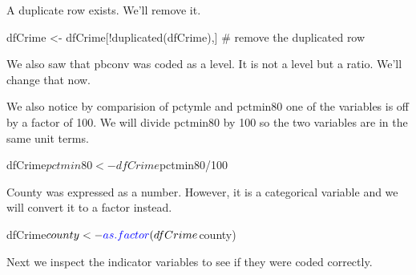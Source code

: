 \documentclass[]{article}
\newenvironment{Shaded}{}{}
\newcommand{\CommentTok}[1]{\textcolor[rgb]{0.00,0.50,0.00}{#1}}
\newcommand{\DecValTok}[1]{#1}
\newcommand{\KeywordTok}[1]{\textcolor[rgb]{0.00,0.00,1.00}{#1}}
\newcommand{\NormalTok}[1]{#1}
\newcommand{\OperatorTok}[1]{#1}
\newcommand{\StringTok}[1]{\textcolor[rgb]{0.00,0.50,0.50}{#1}}
\begin{document}
A duplicate row exists. We'll remove it.

\begin{Shaded}
\begin{Highlighting}[]
\NormalTok{dfCrime <-}\StringTok{ }\NormalTok{dfCrime[}\OperatorTok{!}\KeywordTok{duplicated}\NormalTok{(dfCrime),] }\CommentTok{# remove the duplicated row}
\end{Highlighting}
\end{Shaded}

We also saw that pbconv was coded as a level. It is not a level but a
ratio. We'll change that now.

\begin{Shaded}
\end{Shaded}

We also notice by comparision of pctymle and pctmin80 one of the
variables is off by a factor of 100. We will divide pctmin80 by 100 so
the two variables are in the same unit terms.

\begin{Shaded}
\begin{Highlighting}[]
\NormalTok{dfCrime}\OperatorTok{$}\NormalTok{pctmin80<-dfCrime}\OperatorTok{$}\NormalTok{pctmin80}\OperatorTok{/}\DecValTok{100}
\end{Highlighting}
\end{Shaded}

County was expressed as a number. However, it is a categorical variable
and we will convert it to a factor instead.

\begin{Shaded}
\begin{Highlighting}[]
\NormalTok{dfCrime}\OperatorTok{$}\NormalTok{county<-}\KeywordTok{as.factor}\NormalTok{(dfCrime}\OperatorTok{$}\NormalTok{county)}
\end{Highlighting}
\end{Shaded}

Next we inspect the indicator variables to see if they were coded
correctly.

\begin{Shaded}
\end{Shaded}
\end{document}
